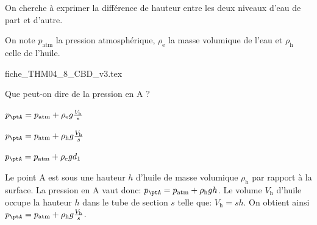 On cherche à exprimer la différence de hauteur entre les deux niveaux d'eau de part et d'autre. 

On note $p_\text{atm}$ la pression atmosphérique, $\rho_\text{e}$ la masse volumique de l'eau et $\rho_\text{h}$ celle de l'huile.

                                \initialisationPartieDroite %
\def\ratioScaleImage{0.9}
\begin{center}
{fiche_THM04_8_CBD_v3.tex}
\end{center}
                               \finalisationDuPartageDePage %


\debutEntrainement


\begin{enonce}	
Que peut-on dire de la pression en A ?	
	\begin{listeQCM3Colonnes}
	\item $p_\ptA=p_\text{atm} + \rho_\text{e}g\frac{V_\text{h}}{s}$
	\item $p_\ptA=p_\text{atm} + \rho_\text{h}g\frac{V_\text{h}}{s}$
	\item  $p_\ptA=p_\text{atm} + \rho_\text{e}gd_1$
	\end{listeQCM3Colonnes}
	\bigskip
\end{enonce}

\reponse{\reponseB}

\begin{corrige}
Le point A est sous une hauteur $h$ d'huile de masse volumique $\rho_\text{h}$ par rapport à la surface. La pression en A vaut donc:
$p_\ptA=p_\text{atm} + \rho_\text{h}gh$.
Le volume $V_\text{h}$ d'huile occupe la hauteur $h$ dans le tube de section $s$ telle que: $V_\text{h}=sh$.
On obtient ainsi $p_\ptA=p_\text{atm} + \rho_\text{h}g\frac{V_\text{h}}{s}$.
\end{corrige}

